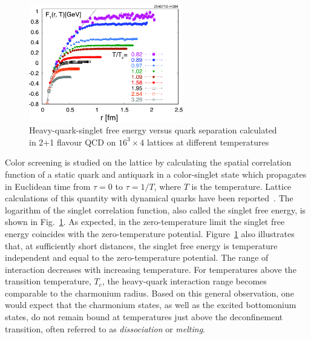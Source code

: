 \begin{figure}[h]
   \begin{center}
      \includegraphics[width=0.6\textwidth]{Figures/LattSingEnergy.pdf}
      \caption{Heavy-quark-singlet free energy versus quark separation 
               calculated in 2+1 flavour QCD
               on $16^3 \times 4$ lattices at different 
               temperatures~\cite{Petreczky:2009ip,Petreczky:2010yn}  
               }
      \label{Fig:LatticeSingEner}
   \end{center}
\end{figure}
Color screening is studied on the lattice by 
calculating the spatial correlation function of a static quark and
antiquark in a color-singlet state which propagates in Euclidean time 
from $\tau=0$ to $\tau=1/T$, where $T$ is the temperature.
Lattice calculations of this quantity with dynamical quarks have been
reported~\cite{Kaczmarek:2002mc,Petreczky:2009ip,Petreczky:2010yn}.
The logarithm of the singlet
correlation function, also called the singlet free energy,
is shown in Fig.~\ref{Fig:LatticeSingEner}. 
As expected, in the zero-temperature limit the
singlet free energy coincides with the zero-temperature potential. 
Figure~\ref{Fig:LatticeSingEner} also illustrates that,
at sufficiently short distances, the singlet free energy is
temperature independent and equal to the zero-temperature potential. 
The range of interaction decreases with increasing temperature.  For 
temperatures above the transition temperature, $T_c$, the heavy-quark 
interaction range becomes comparable to the charmonium radius. Based on 
this general observation, one would expect that the charmonium
states, as well as the excited bottomonium states, do not remain bound at
temperatures just above the deconfinement transition, often referred to as 
{\em dissociation} or {\em melting}. 

